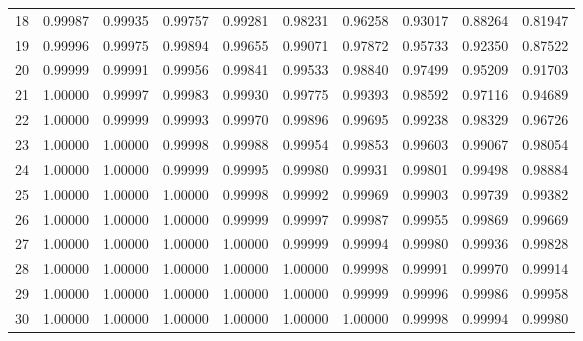 \begin{tabular}{r|*{9}{c}}
 18 & 0.99987 & 0.99935 & 0.99757 & 0.99281 & 0.98231 & 0.96258 & 0.93017 & 0.88264 & 0.81947 \\
 19 & 0.99996 & 0.99975 & 0.99894 & 0.99655 & 0.99071 & 0.97872 & 0.95733 & 0.92350 & 0.87522 \\
 20 & 0.99999 & 0.99991 & 0.99956 & 0.99841 & 0.99533 & 0.98840 & 0.97499 & 0.95209 & 0.91703 \\
 21 & 1.00000 & 0.99997 & 0.99983 & 0.99930 & 0.99775 & 0.99393 & 0.98592 & 0.97116 & 0.94689 \\
 22 & 1.00000 & 0.99999 & 0.99993 & 0.99970 & 0.99896 & 0.99695 & 0.99238 & 0.98329 & 0.96726 \\
 23 & 1.00000 & 1.00000 & 0.99998 & 0.99988 & 0.99954 & 0.99853 & 0.99603 & 0.99067 & 0.98054 \\
 24 & 1.00000 & 1.00000 & 0.99999 & 0.99995 & 0.99980 & 0.99931 & 0.99801 & 0.99498 & 0.98884 \\
 25 & 1.00000 & 1.00000 & 1.00000 & 0.99998 & 0.99992 & 0.99969 & 0.99903 & 0.99739 & 0.99382 \\
 26 & 1.00000 & 1.00000 & 1.00000 & 0.99999 & 0.99997 & 0.99987 & 0.99955 & 0.99869 & 0.99669 \\
 27 & 1.00000 & 1.00000 & 1.00000 & 1.00000 & 0.99999 & 0.99994 & 0.99980 & 0.99936 & 0.99828 \\
 28 & 1.00000 & 1.00000 & 1.00000 & 1.00000 & 1.00000 & 0.99998 & 0.99991 & 0.99970 & 0.99914 \\
 29 & 1.00000 & 1.00000 & 1.00000 & 1.00000 & 1.00000 & 0.99999 & 0.99996 & 0.99986 & 0.99958 \\
 30 & 1.00000 & 1.00000 & 1.00000 & 1.00000 & 1.00000 & 1.00000 & 0.99998 & 0.99994 & 0.99980 \\
\end{tabular}

\myskip


